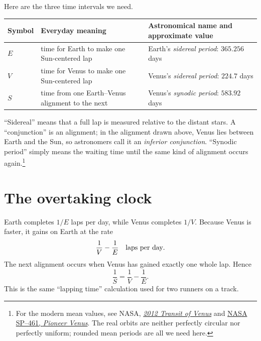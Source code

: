 Here are the three time intervals we need.

\begin{center}
\small
\begin{tabularx}{\textwidth}{>{\bfseries}p{}p{}X}
\toprule
Symbol & Everyday meaning & Astronomical name and approximate value \\
\midrule
$E$ & time for Earth to make one Sun-centered lap
& Earth's \emph{sidereal period}: $365.256$ days \\
$V$ & time for Venus to make one Sun-centered lap
& Venus's \emph{sidereal period}: $224.7$ days \\
$S$ & time from one Earth--Venus alignment to the next
& Venus's \emph{synodic period}: $583.92$ days \\
\bottomrule
\end{tabularx}
\end{center}

``Sidereal'' means that a full lap is measured relative to the distant stars.
A ``conjunction'' is an alignment; in the alignment drawn above, Venus lies
between Earth and the Sun, so astronomers call it an \emph{inferior
conjunction}.  ``Synodic period'' simply means the waiting time until the same
kind of alignment occurs again.\footnote{For the modern mean values, see NASA,
\href{https://eclipse.gsfc.nasa.gov/OH/transit12.html}{\emph{2012 Transit of
Venus}} and \href{https://history.arc.nasa.gov/hist_pdfs/nasa_sp461.pdf}{NASA
SP--461, \emph{Pioneer Venus}}.  The real orbits are neither perfectly circular
nor perfectly uniform; rounded mean periods are all we need here.}

\section{The overtaking clock}

Earth completes $1/E$ laps per day, while Venus completes $1/V$.  Because Venus
is faster, it gains on Earth at the rate
\[
  \frac1V-\frac1E\quad\hbox{laps per day}.
\]
The next alignment occurs when Venus has gained exactly one whole lap.  Hence
\begin{equation}
  \frac1S=\frac1V-\frac1E.                         \label{eq:venus-beat}
\end{equation}
This is the same ``lapping time'' calculation used for two runners on a track.

